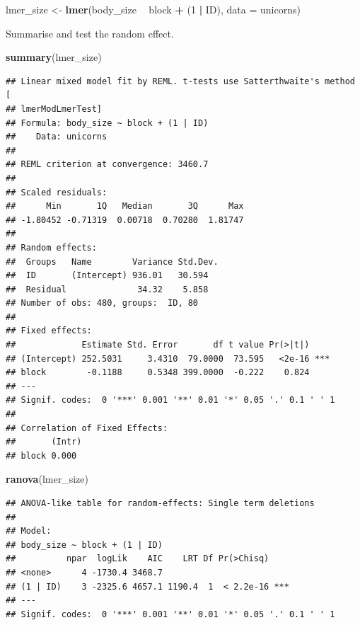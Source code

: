 \documentclass[
  12pt,
]{book}
\newenvironment{Shaded}{\begin{snugshade}}{\end{snugshade}}
\newcommand{\DataTypeTok}[1]{\textcolor[rgb]{0.13,0.29,0.53}{#1}}
\newcommand{\DecValTok}[1]{\textcolor[rgb]{0.00,0.00,0.81}{#1}}
\newcommand{\KeywordTok}[1]{\textcolor[rgb]{0.13,0.29,0.53}{\textbf{#1}}}
\newcommand{\NormalTok}[1]{#1}
\newcommand{\OperatorTok}[1]{\textcolor[rgb]{0.81,0.36,0.00}{\textbf{#1}}}
\newcommand{\StringTok}[1]{\textcolor[rgb]{0.31,0.60,0.02}{#1}}
\begin{document}
\begin{Shaded}
\begin{Highlighting}[]
\NormalTok{lmer_size <-}\StringTok{ }\KeywordTok{lmer}\NormalTok{(body_size }\OperatorTok{~}\StringTok{ }\NormalTok{block }\OperatorTok{+}\StringTok{ }\NormalTok{(}\DecValTok{1} \OperatorTok{|}\StringTok{ }\NormalTok{ID),}
                \DataTypeTok{data =}\NormalTok{ unicorns)}
\end{Highlighting}
\end{Shaded}

Summarise and test the random effect.

\begin{Shaded}
\begin{Highlighting}[]
\KeywordTok{summary}\NormalTok{(lmer_size)}
\end{Highlighting}
\end{Shaded}

\begin{verbatim}
## Linear mixed model fit by REML. t-tests use Satterthwaite's method [
## lmerModLmerTest]
## Formula: body_size ~ block + (1 | ID)
##    Data: unicorns
## 
## REML criterion at convergence: 3460.7
## 
## Scaled residuals: 
##      Min       1Q   Median       3Q      Max 
## -1.80452 -0.71319  0.00718  0.70280  1.81747 
## 
## Random effects:
##  Groups   Name        Variance Std.Dev.
##  ID       (Intercept) 936.01   30.594  
##  Residual              34.32    5.858  
## Number of obs: 480, groups:  ID, 80
## 
## Fixed effects:
##             Estimate Std. Error       df t value Pr(>|t|)    
## (Intercept) 252.5031     3.4310  79.0000  73.595   <2e-16 ***
## block        -0.1188     0.5348 399.0000  -0.222    0.824    
## ---
## Signif. codes:  0 '***' 0.001 '**' 0.01 '*' 0.05 '.' 0.1 ' ' 1
## 
## Correlation of Fixed Effects:
##       (Intr)
## block 0.000
\end{verbatim}

\begin{Shaded}
\begin{Highlighting}[]
\KeywordTok{ranova}\NormalTok{(lmer_size)}
\end{Highlighting}
\end{Shaded}

\begin{verbatim}
## ANOVA-like table for random-effects: Single term deletions
## 
## Model:
## body_size ~ block + (1 | ID)
##          npar  logLik    AIC    LRT Df Pr(>Chisq)    
## <none>      4 -1730.4 3468.7                         
## (1 | ID)    3 -2325.6 4657.1 1190.4  1  < 2.2e-16 ***
## ---
## Signif. codes:  0 '***' 0.001 '**' 0.01 '*' 0.05 '.' 0.1 ' ' 1
\end{verbatim}
\end{document}
